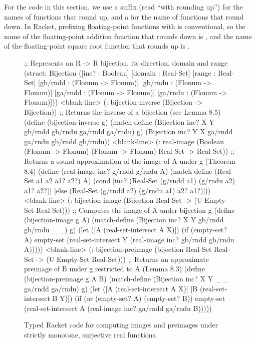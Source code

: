 For the code in this section, we use a  suffix (read ``with rounding up'') for the names of functions that round up, and a  for the name of functions that round down.
In Racket, prefixing floating-point functions with  is conventional, so the name of the floating-point addition function that rounds down is , and the name of the floating-point square root function that rounds up is .

\begin{figure}[tb!]\centering
\begin{schemedisplay}
;; Represents an R -> R bijection, its direction, domain and range
(struct: Bijection
    ([inc? : Boolean] [domain : Real-Set] [range : Real-Set]
     [gb/rndd : (Flonum -> Flonum)] [gb/rndu : (Flonum -> Flonum)]
     [ga/rndd : (Flonum -> Flonum)] [ga/rndu : (Flonum -> Flonum)]))
<blank-line>
(: bijection-inverse (Bijection -> Bijection))
;; Returns the inverse of a bijection (see Lemma 8.5)
(define (bijection-inverse g)
  (match-define (Bijection inc? X Y gb/rndd gb/rndu ga/rndd ga/rndu) g)
  (Bijection inc? Y X ga/rndd ga/rndu gb/rndd gb/rndu))
<blank-line>
(: real-image (Boolean (Flonum -> Flonum) (Flonum -> Flonum) Real-Set
                -> Real-Set))
;; Returns a sound approximation of the image of A under g (Theorem 8.4)
(define (real-image inc? g/rndd g/rndu A)
  (match-define (Real-Set a1 a2 a1? a2?) A)
  (cond [inc?  (Real-Set (g/rndd a1) (g/rndu a2) a1? a2?)]
        [else  (Real-Set (g/rndd a2) (g/rndu a1) a2? a1?)]))
<blank-line>
(: bijection-image (Bijection Real-Set -> (U Empty-Set Real-Set)))
;; Computes the image of A under bijection g
(define (bijection-image g A)
  (match-define (Bijection inc? X Y gb/rndd gb/rndu _ _) g)
  (let ([A  (real-set-intersect A X)])
    (if (empty-set? A)
        empty-set
        (real-set-intersect Y (real-image inc? gb/rndd gb/rndu A)))))
<blank-line>
(: bijection-preimage (bijection Real-Set Real-Set -> (U Empty-Set Real-Set)))
;; Returns an approximate preimage of B under g restricted to A (Lemma 8.3)
(define (bijection-preimage g A B)
  (match-define (Bijection inc? X Y _ _ ga/rndd ga/rndu) g)
  (let ([A  (real-set-intersect A X)]
        [B  (real-set-intersect B Y)])
    (if (or (empty-set? A) (empty-set? B))
        empty-set
        (real-set-intersect A (real-image inc? ga/rndd ga/rndu B)))))
\end{schemedisplay}
\bottomhrule
\caption[Computing images and preimages under real functions]{Typed Racket code for computing images and preimages under strictly monotone, surjective real functions.}
\label{fig:bijection-implementation}
\end{figure}

